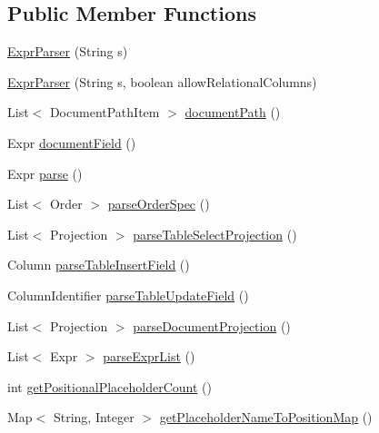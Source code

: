 \subsection*{Public Member Functions}
\begin{DoxyCompactItemize}
\item 
\mbox{\hyperlink{classcom_1_1mysql_1_1cj_1_1xdevapi_1_1_expr_parser_ad70ff0dd3eb608b91d106978a6740d49}{Expr\+Parser}} (String s)
\item 
\mbox{\hyperlink{classcom_1_1mysql_1_1cj_1_1xdevapi_1_1_expr_parser_a77381c9ab6c86b7c5fb792ffa16366cc}{Expr\+Parser}} (String s, boolean allow\+Relational\+Columns)
\item 
List$<$ Document\+Path\+Item $>$ \mbox{\hyperlink{classcom_1_1mysql_1_1cj_1_1xdevapi_1_1_expr_parser_a5739c15d14dc9c0cf24656cd095e2e11}{document\+Path}} ()
\item 
Expr \mbox{\hyperlink{classcom_1_1mysql_1_1cj_1_1xdevapi_1_1_expr_parser_aaabe0dbc40e4e4a9e8af0ee1c357dcdd}{document\+Field}} ()
\item 
Expr \mbox{\hyperlink{classcom_1_1mysql_1_1cj_1_1xdevapi_1_1_expr_parser_a4b585b964454cc26c544d824d33b3498}{parse}} ()
\item 
List$<$ Order $>$ \mbox{\hyperlink{classcom_1_1mysql_1_1cj_1_1xdevapi_1_1_expr_parser_aa948ecc19739c733f80c170943ce53fe}{parse\+Order\+Spec}} ()
\item 
List$<$ Projection $>$ \mbox{\hyperlink{classcom_1_1mysql_1_1cj_1_1xdevapi_1_1_expr_parser_a236fa3f356e511f04e6dfb64a333b354}{parse\+Table\+Select\+Projection}} ()
\item 
Column \mbox{\hyperlink{classcom_1_1mysql_1_1cj_1_1xdevapi_1_1_expr_parser_a2c759e26260efb3a807ea8ca178d7f55}{parse\+Table\+Insert\+Field}} ()
\item 
Column\+Identifier \mbox{\hyperlink{classcom_1_1mysql_1_1cj_1_1xdevapi_1_1_expr_parser_ab2e27d666920b2b5e2985b98a7c658d7}{parse\+Table\+Update\+Field}} ()
\item 
List$<$ Projection $>$ \mbox{\hyperlink{classcom_1_1mysql_1_1cj_1_1xdevapi_1_1_expr_parser_a93ace436851f9df69c5e69828b19d02c}{parse\+Document\+Projection}} ()
\item 
List$<$ Expr $>$ \mbox{\hyperlink{classcom_1_1mysql_1_1cj_1_1xdevapi_1_1_expr_parser_ae0e58b00609560b6a43556d12491d152}{parse\+Expr\+List}} ()
\item 
int \mbox{\hyperlink{classcom_1_1mysql_1_1cj_1_1xdevapi_1_1_expr_parser_a1966233da75608f47433e709b6493adf}{get\+Positional\+Placeholder\+Count}} ()
\item 
Map$<$ String, Integer $>$ \mbox{\hyperlink{classcom_1_1mysql_1_1cj_1_1xdevapi_1_1_expr_parser_a71d5c16a61ebe39a18c6e861f93acaa7}{get\+Placeholder\+Name\+To\+Position\+Map}} ()
\end{DoxyCompactItemize}



